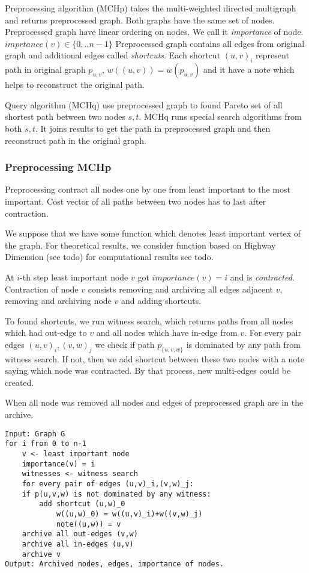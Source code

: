 Preprocessing algorithm (MCHp) takes the multi-weighted directed multigraph
and returns preprocessed graph. Both graphs have the same set of nodes.
Preprocessed graph have linear ordering on nodes. We call it \emph{importance} of
node. $imprtance(v) \in \{0,..n-1\}$ 
Preprocessed graph contains all edges from original graph
and additional edges called \emph{shortcuts}. Each shortcut $(u,v)_i$ represent 
path in original graph $p_{u,v}$, $w((u,v)) = w(p_{u,v})$ and it have a note which helps
to reconstruct the original path.

Query algorithm (MCHq) use preprocessed graph to found Pareto set of all
shortest path between two nodes $s, t$. MCHq runs special search algorithms
from both $s, t$. It joins results to get the path in preprocessed graph and then reconstruct path in the original graph.

\subsubsection{Preprocessing MCHp}

Preprocessing contract all nodes one by one from least important to the most important. 
Cost vector of all paths between two nodes has to last after contraction.

We suppose that we have some function which denotes least important vertex of the graph. For theoretical results, we consider function based on Highway Dimension
(see todo)  for computational results see todo.

At $i$-th step least important node $v$ got $importance(v) = i$ and is \emph{contracted}. 
Contraction of node $v$ consists removing and archiving all edges adjacent $v$, removing 
and archiving node $v$ and adding shortcuts. 

To found shortcuts, we run witness search, which returns paths from all nodes which had
out-edge to $v$ and all nodes which have in-edge from $v$. 
For every pair edges $(u,v)_i,(v,w)_j$ we check 
if path $p_{\{u,v,w\}}$ is dominated by any path from witness search. 
If not, then we add shortcut between these two nodes with a note 
saying which node was contracted.
By that process, new multi-edges could be created.

When all node was removed all nodes and edges of preprocessed graph are in the archive.

\begin{lstlisting}[caption={MCHp},label=list:8-6,captionpos=t,float,abovecaptionskip=-\medskipamount]
Input: Graph G
for i from 0 to n-1
    v <- least important node
    importance(v) = i
    witnesses <- witness search
    for every pair of edges (u,v)_i,(v,w)_j:
    if p(u,v,w) is not dominated by any witness:
        add shortcut (u,w)_0
            w((u,w)_0) = w((u,v)_i)+w((v,w)_j)
            note((u,w)) = v
    archive all out-edges (v,w) 
    archive all in-edges (u,v)
    archive v
Output: Archived nodes, edges, importance of nodes.
\end{lstlisting}



